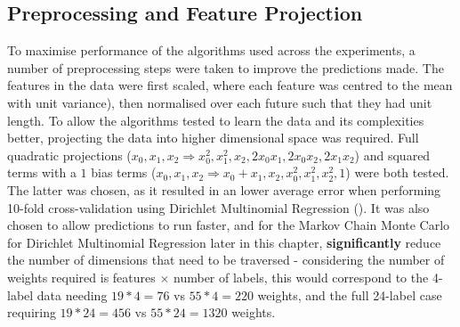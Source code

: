 \subsection{Preprocessing and Feature Projection}
To maximise performance of the algorithms used across the experiments, a number of preprocessing steps were taken to improve the predictions made. The features in the data were first scaled, where each feature was centred to the mean with unit variance), then normalised over each future such that they had unit length. To allow the algorithms tested to learn the data and its complexities better, projecting the data into higher dimensional space was required. Full quadratic projections ($x_0, x_1, x_2 \Rightarrow x_0^2 ,x_1^2 ,x_2 ,2x_0x_1 ,2x_0x_2 ,2x_1x_2$) and squared terms with a $1$ bias terms ($x_0, x_1, x_2 \Rightarrow x_0 + x_1 , x_2 ,x_0^2 ,x_1^2, x_2^2, 1$) were both tested. The latter was chosen, as it resulted in an lower average error when performing 10-fold cross-validation using Dirichlet Multinomial Regression (). It was also chosen to allow predictions to run faster, and for the Markov Chain Monte Carlo for Dirichlet Multinomial Regression later in this chapter, \textbf{significantly} reduce the number of dimensions that need to be traversed - considering the number of weights required is features $\times$ number of labels, this would correspond to the 4-label data needing $19*4=76$ vs $55*4=220$ weights, and the full 24-label case requiring $19*24=456$ vs $55*24=1320$ weights.

% 


